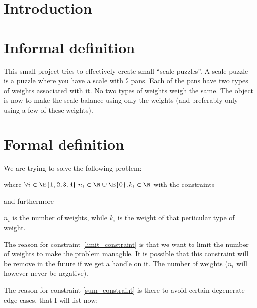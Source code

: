 \section{Introduction}

\section{Informal definition}

This small project tries to effectively create small ``scale puzzles''. A scale puzzle is a puzzle where you have a scale with 2 pans. Each of the pans have two types of weights associated with it. No two types of weights weigh the same. The object is now to make the scale balance using only the weights (and preferably only using a few of these weights).

\section{Formal definition}

We are trying to solve the following problem:

where $\forall i \in \E{1,2,3,4}\; n_i \in \N \cup \E{0}, k_i \in \N$ with the constraints 



and furthermore 




$n_i$ is the number of weights, while $k_i$ is the weight of that perticular type of weight.

The reason for constraint \ref{limit_constraint} is that we want to limit the number of weights to make the problem managble. It is possible that this constraint will be remove in the future if we get a handle on it. The number of weights ($n_i$ will however never be negative).

The reason for constraint \ref{sum_constraint} is there to avoid certain degenerate edge cases, that I will list now:

